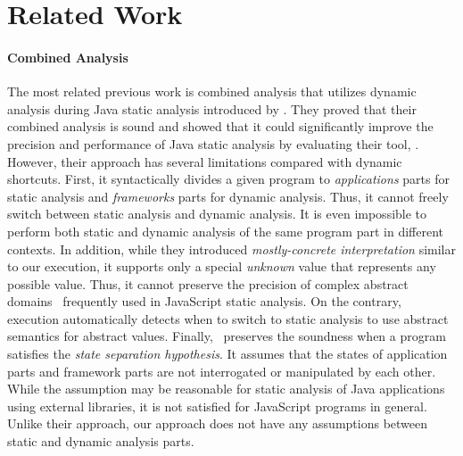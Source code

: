 \section{Related Work}\label{sec:related}


\paragraph{Combined Analysis}
The most related previous work is combined analysis that utilizes dynamic
analysis during Java static analysis introduced by \citet{concerto}.
They proved that their combined analysis is sound and showed that it could
significantly improve the precision and performance of Java static analysis by
evaluating their tool, \concerto.  However, their approach has several
limitations compared with dynamic shortcuts.  First, it syntactically
divides a given program to \textit{applications} parts for static
analysis and \textit{frameworks} parts for dynamic analysis.  Thus, it cannot
freely switch between static analysis and dynamic analysis.  It is
even impossible to perform both static and dynamic analysis of 
the same program part in different contexts.  In addition, while they
introduced \textit{mostly-concrete interpretation} similar to our
{\sealed} execution, it supports only a special \textit{unknown}
value that represents any possible value.  Thus, it cannot preserve
the precision of complex abstract domains~\cite{revisit-recency,
  regex, weaklySPE} frequently used in JavaScript static analysis.
On the contrary, {\sealed} execution automatically detects when
to switch to static analysis to use abstract semantics for abstract values.
Finally, \concerto\ preserves the soundness when a program satisfies
the \textit{state separation hypothesis}.  It assumes that the states
of application parts and framework parts are not interrogated
or manipulated by each other.  While the assumption may be reasonable
for static analysis of Java applications using external libraries, it
is not satisfied for JavaScript programs in general.  Unlike their
approach, our approach does not have any assumptions between static and
dynamic analysis parts.


